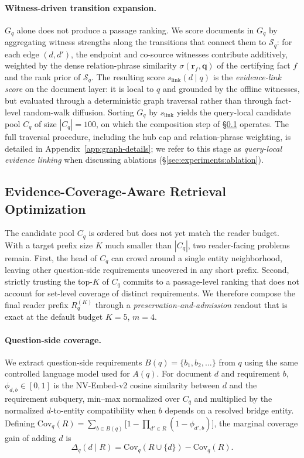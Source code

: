 \paragraph{Witness-driven transition expansion.}
$G_q$ alone does not produce a passage ranking. We score documents
in $G_q$ by aggregating witness strengths along the transitions
that connect them to $\mathcal{S}_q$: for each edge $(d, d')$, the
endpoint and co-source witnesses contribute additively, weighted by
the dense relation-phrase similarity $\sigma(\mathbf{r}_f,
\mathbf{q})$ of the certifying fact $f$ and the rank prior of
$\mathcal{S}_q$. The resulting score $s_{\mathrm{link}}(d \mid q)$
is the \emph{evidence-link score} on the document layer: it is local to
$q$ and grounded by the offline witnesses, but evaluated through a
deterministic graph traversal rather than through fact-level
random-walk diffusion. Sorting $G_q$ by $s_{\mathrm{link}}$ yields
the query-local candidate pool $C_q$ of size $|C_q|=100$, on which
the composition step of \S\ref{sec:method:enhancement} operates.
The full traversal procedure, including the hub cap and
relation-phrase weighting, is detailed in
Appendix~\ref{app:graph-details}; we refer to this stage as
\emph{query-local evidence linking} when discussing ablations
(\S\ref{sec:experiments:ablation}).

\subsection{Evidence-Coverage-Aware Retrieval Optimization}
\label{sec:method:enhancement}

The candidate pool $C_q$ is ordered but does not yet match the
reader budget. With a target prefix size $K$ much smaller than
$|C_q|$, two reader-facing problems remain. First, the head of $C_q$
can crowd around a single entity neighborhood, leaving other
question-side requirements uncovered in any short prefix. Second,
strictly trusting the top-$K$ of $C_q$ commits to a passage-level
ranking that does not account for set-level coverage of distinct
requirements. We therefore compose the final reader prefix
$R_q^{(K)}$ through a \emph{preservation-and-admission} readout
that is exact at the default budget $K=5$, $m=4$.

\paragraph{Question-side coverage.}
We extract question-side requirements $B(q)=\{b_1,b_2,\ldots\}$
from $q$ using the same controlled language model used for $A(q)$.
For document $d$ and requirement $b$, $\phi_{d,b}\in[0,1]$ is the
NV-Embed-v2 cosine similarity between $d$ and the requirement
subquery, min--max normalized over $C_q$ and multiplied by the
normalized $d$-to-entity compatibility when $b$ depends on a
resolved bridge entity. Defining
$\mathrm{Cov}_q(R)=\sum_{b\in B(q)}\bigl[1-\prod_{d'\in R}(1-\phi_{d',b})\bigr]$,
the marginal coverage gain of adding $d$ is
\begin{equation}
\label{eq:marginal-gain}
\Delta_q(d \mid R) = \mathrm{Cov}_q(R\cup\{d\}) - \mathrm{Cov}_q(R).
\end{equation}

